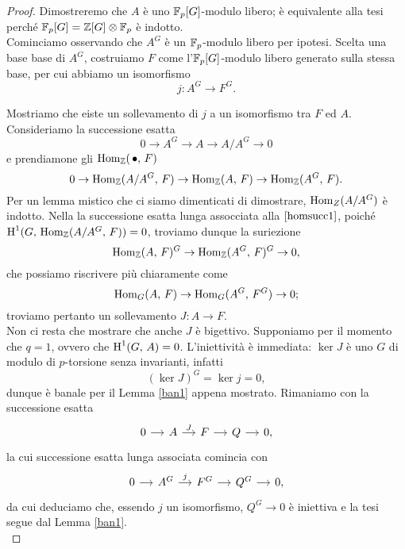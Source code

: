 \begin{proof}
	Dimostreremo che $ A $ è uno $ \mathbb{F}_p[G] $-modulo libero; è equivalente alla tesi perché $ \mathbb{F}_p[G] = \mathbb{Z}[G] \otimes \mathbb{F}_p $ è indotto. \\
	
	Cominciamo osservando che $ A^G $ è un $ \mathbb{F}_p $-modulo libero per ipotesi. Scelta una base base di $ A^G $, costruiamo $ F $ come l'$ \mathbb{F}_p[G] $-modulo libero generato sulla stessa base, per cui abbiamo un isomorfismo
	\[ j \colon A^G \to F^G. \]
	
	Mostriamo che eiste un sollevamento di $ j $ a un isomorfismo tra $ F $ ed $ A $. Consideriamo la successione esatta
	\[ 0 \to A^G \to A \to A/A^G \to 0 \]
	e prendiamone gli $ \operatorname{Hom}_{\mathbb{Z}}(\, \bullet, \, F) $
	\begin{equation}\label{homsucc1}
		0 \to \operatorname{Hom}_{\mathbb{Z}}(A/A^G, \, F) \to \operatorname{Hom}_{\mathbb{Z}}(A, \, F) \to \operatorname{Hom}_{\mathbb{Z}}(A^G, \, F).
	\end{equation}
	Per un lemma mistico che ci siamo dimenticati di dimostrare, $ \operatorname{Hom}_Z(A/A^G) $ è indotto.  Nella la successione esatta lunga assocciata alla $ \ref{homsucc1} $, poiché $ \operatorname{H}^1(G, \, \operatorname{Hom}_{\mathbb{Z}}(A/A^G, \, F)) = 0 $, troviamo dunque la suriezione
	\[ \operatorname{Hom}_{\mathbb{Z}}(A, \, F)^G \to \operatorname{Hom}_{\mathbb{Z}}(A^G, \, F)^G \to 0, \]
	che possiamo riscrivere più chiaramente come
	\[ \operatorname{Hom}_G(A, \, F) \to \operatorname{Hom}_G(A^G, \, F^G) \to 0; \]
	troviamo pertanto un sollevamento $ J \colon A \to F $.\\
	
	Non ci resta che mostrare che anche $ J $ è bigettivo. Supponiamo per il momento che $ q = 1 $, ovvero che $ \operatorname{H}^1(G, \, A) = 0 $. L'iniettività è immediata: $ \ker J $ è uno $ G $ di modulo di $ p $-torsione senza invarianti, infatti
	\[ (\ker J)^G = \ker j = 0, \]
	dunque è banale per il Lemma \ref{ban1} appena mostrato. Rimaniamo con la successione esatta
	\[ \begin{tikzcd}[column sep = small]
	0 \rar& A \rar["J"]& F \rar& Q \rar& 0,
	\end{tikzcd} \]
	la cui successione esatta lunga associata comincia con
	\[ \begin{tikzcd}[column sep = small]
	0 \rar & A^G \rar["j"] & F^G \rar & Q^G \rar & 0,
	\end{tikzcd} \]
	da cui deduciamo che, essendo $ j $ un isomorfismo, $ Q^G \to 0 $ è iniettiva e la tesi segue dal Lemma \ref{ban1}.\\
	

\end{proof}

